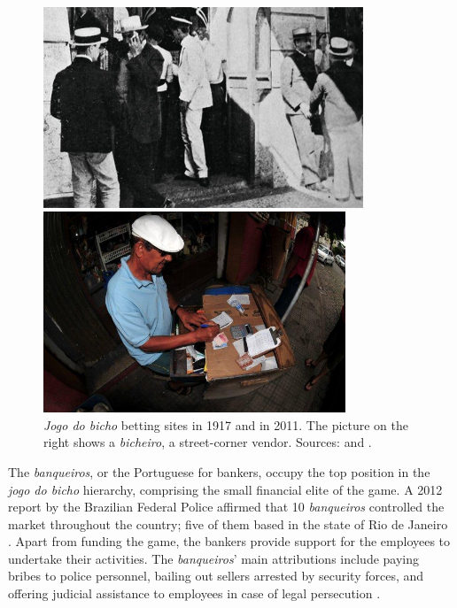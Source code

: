\begin{figure}[!htbp]
	\centering
	\begin{minipage}[b]{0.45\textwidth}
		\includegraphics[width=\textwidth, height=6cm]{images/bicho03.jpg}
	\end{minipage}
	\hfill
	\begin{minipage}[b]{0.45\textwidth}
		\includegraphics[width=\textwidth, height=6cm]{images/bicho04.jpg}
	\end{minipage}
	\caption{\emph{Jogo do bicho} betting sites in 1917 and in 2011. The picture on the right shows a \emph{bicheiro}, a street-corner vendor. Sources: \citet{alecrim2012bicho} and \citet{ferrarini2011bicho}.}
	\label{fig:banca1917}
\end{figure}

The \emph{banqueiros}, or the Portuguese for bankers, occupy the top position in the \emph{jogo do bicho} hierarchy, comprising the small financial elite of the game. A 2012 report by the Brazilian Federal Police affirmed that 10 \emph{banqueiros} controlled the market throughout the country; five of them based in the state of Rio de Janeiro \citep{globo2012contraventores}. Apart from funding the game, the bankers provide support for the employees to undertake their activities. The \emph{banqueiros}' main attributions include paying bribes to police personnel, bailing out sellers arrested by security forces, and offering judicial assistance to employees in case of legal persecution \citep[75]{labronici2012paratodos}.

